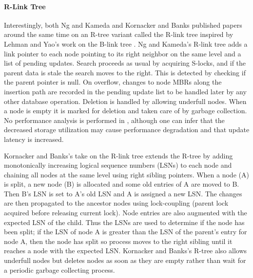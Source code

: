 \paragraph{R-Link Tree} Interestingly, both Ng and Kameda\cite{ng1994r} and 
Kornacker and Banks\cite{kornacker1995high} published papers around the same time on 
an R-tree variant called the R-link tree inspired by Lehman and Yao's work on the 
B-link tree \cite{lehman1981efficient}. Ng and Kameda's R-link tree\cite{ng1994r} 
adds a link pointer to each node pointing to its right neighbor on the same level and
a list of pending updates. Search proceeds as usual by acquiring S-locks, and 
if the parent data is stale the search moves to the right. This is detected by
checking if the parent pointer is null. On overflow, changes to node MBRs along 
the insertion path are recorded in the pending update list to be handled later 
by any other database operation. Deletion is handled by allowing underfull nodes.
When a node is empty it is marked for deletion and taken care of by garbage
collection. No performance analysis is performed in \cite{ng1994r}, although one
can infer that the decreased storage utilization may cause performance degradation
and that update latency is increased.

Kornacker and Banks's take on the R-link tree\cite{kornacker1995high} extends 
the R-tree by adding monotonically increasing logical sequence numbers (LSNs) 
to each node and chaining all nodes at the same level using right sibling 
pointers. When a node (A) is split, a new node (B) is allocated and some old 
entries of A are moved to B. Then B's LSN is set to A's old LSN and A is assigned 
a new LSN. The changes are then propagated to the ancestor nodes using lock-coupling
(parent lock acquired before releasing current lock). Node entries are also 
augmented with the expected LSN of the child. Thus the LSNs are used 
to determine if the node has been split; if the LSN of node A is greater than 
the LSN of the parent's entry for node A, then the node has split so process 
moves to the right sibling until it reaches a node with the expected LSN. 
Kornacker and Banks's R-tree also allows underfull nodes but deletes nodes as 
soon as they are empty rather than wait for a periodic garbage collecting process.

	
